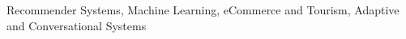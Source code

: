 
Recommender Systems, Machine Learning, eCommerce and Tourism, Adaptive and Conversational Systems  \\ \\